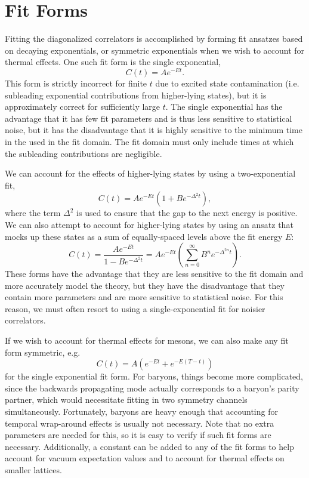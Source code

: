 \section{Fit Forms}\label{sec:fit_forms}
Fitting the diagonalized correlators is accomplished by forming fit ansatzes based on decaying exponentials, or symmetric exponentials when we wish to account for thermal effects. One such fit form is the single exponential,
\begin{equation}\label{eq:single_exp}
    C(t) = Ae^{-E t}.
\end{equation}
This form is strictly incorrect for finite $t$ due to excited state contamination (i.e. subleading exponential contributions from higher-lying states), but it is approximately correct for sufficiently large $t$. The single exponential has the advantage that it has few fit parameters and is thus less sensitive to statistical noise, but it has the disadvantage that it is highly sensitive to the minimum time in the used in the fit domain. The fit domain must only include times at which the subleading contributions are negligible.

We can account for the effects of higher-lying states by using a two-exponential fit,
\begin{equation}
    C(t)=A e^{-E t}\left(1+B e^{-\Delta^{2} t}\right),
\end{equation}
where the term $\Delta^2$ is used to ensure that the gap to the next energy is positive. We can also attempt to account for higher-lying states by using an ansatz that mocks up these states as a sum of equally-spaced levels above the fit energy $E$:
\begin{equation}
    C(t)=\frac{A e^{-E t}}{1-B e^{-\Delta^{2} t}} = Ae^{-Et}\left(\sum_{n=0}^\infty B^n e^{-\Delta^{2n}t}\right).
\end{equation}
These forms have the advantage that they are less sensitive to the fit domain and more accurately model the theory, but they have the disadvantage that they contain more parameters and are more sensitive to statistical noise. For this reason, we must often resort to using a single-exponential fit for noisier correlators.

If we wish to account for thermal effects for mesons, we can also make any fit form symmetric, e.g.
\begin{equation}
    C(t)=A\left(e^{-E t}+e^{-E(T-t)}\right)
\end{equation}
for the single exponential fit form. For baryons, things become more complicated, since the backwards propagating mode actually corresponds to a baryon's parity partner, which would necessitate fitting in two symmetry channels simultaneously. Fortunately, baryons are heavy enough that accounting for temporal wrap-around effects is usually not necessary. Note that no extra parameters are needed for this, so it is easy to verify if such fit forms are necessary. Additionally, a constant can be added to any of the fit forms to help account for vacuum expectation values and to account for thermal effects on smaller lattices.
